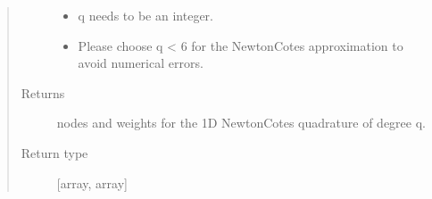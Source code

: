 \documentclass[letterpaper,10pt,english]{sphinxmanual}
\begin{document}
\begin{fulllineitems}
\begin{quote}
\begin{description}
\begin{itemize}
\item {} 
 \textendash{} q needs to be an integer.

\item {} 
 \textendash{} Please choose q \textless{} 6 for the Newton\sphinxhyphen{}Cotes approximation to avoid numerical errors.

\end{itemize}

\item[{Returns}] \leavevmode
nodes and weights for the 1D Newton\sphinxhyphen{}Cotes quadrature of degree q.

\item[{Return type}] \leavevmode
{[}array, array{]}

\end{description}\end{quote}

\end{fulllineitems}

\end{document}
